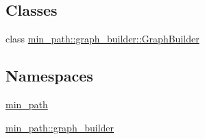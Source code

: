 \subsection*{Classes}
\begin{DoxyCompactItemize}
\item 
class \hyperlink{a00007}{min\+\_\+path\+::graph\+\_\+builder\+::\+Graph\+Builder}
\end{DoxyCompactItemize}
\subsection*{Namespaces}
\begin{DoxyCompactItemize}
\item 
 \hyperlink{a00033}{min\+\_\+path}
\item 
 \hyperlink{a00036}{min\+\_\+path\+::graph\+\_\+builder}
\end{DoxyCompactItemize}
